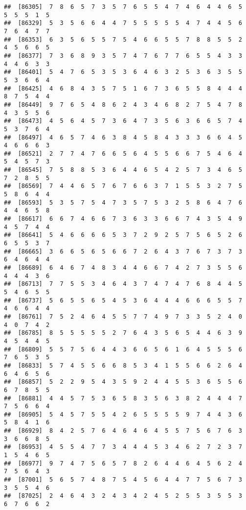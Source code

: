 \documentclass[
]{book}
\begin{document}
\begin{verbatim}
##  [86305]  7  8  6  5  7  3  5  7  6  5  5  4  7  4  6  4  4  6  5  5  5  5  1  5
##  [86329]  5  3  5  6  6  4  4  7  5  5  5  5  5  4  7  4  4  5  6  7  6  4  7  7
##  [86353]  6  3  5  6  5  5  7  5  4  6  6  5  5  7  8  8  5  5  2  4  5  6  6  5
##  [86377]  7  3  6  8  9  3  5  7  4  7  6  7  7  6  5  5  4  3  3  4  4  6  3  3
##  [86401]  5  4  7  6  5  3  5  3  6  4  6  3  2  5  3  6  3  5  5  5  3  6  6  4
##  [86425]  4  6  8  4  3  5  7  5  1  6  7  3  6  5  5  8  4  4  4  8  7  5  4  4
##  [86449]  9  7  6  5  4  8  6  2  4  3  4  6  8  2  7  5  4  7  8  4  3  5  5  6
##  [86473]  4  5  6  4  5  7  3  6  4  7  3  5  6  3  6  6  5  7  4  5  3  7  6  4
##  [86497]  4  6  5  7  4  6  3  8  4  5  8  4  3  3  3  6  6  4  5  4  6  6  6  3
##  [86521]  2  7  7  4  7  6  6  5  6  4  5  5  6  6  7  5  4  6  4  5  4  5  7  3
##  [86545]  7  5  8  8  5  3  6  4  4  6  5  4  2  5  7  3  4  6  5  7  2  8  5  5
##  [86569]  7  4  4  6  5  7  6  7  6  6  3  7  1  5  5  3  2  7  5  5  8  6  4  4
##  [86593]  5  3  5  7  5  4  7  3  5  7  5  3  2  5  8  6  4  7  6  4  4  6  5  8
##  [86617]  6  6  7  4  6  6  7  3  6  3  3  6  6  7  4  3  5  4  9  4  5  7  4  4
##  [86641]  5  4  6  6  6  6  5  3  7  2  9  2  5  7  5  6  5  2  6  6  5  5  3  7
##  [86665]  3  6  6  5  6  5  6  6  7  2  6  4  3  7  6  7  3  7  3  6  4  6  4  4
##  [86689]  6  4  6  7  4  8  3  4  4  6  6  7  4  2  7  3  5  5  6  4  4  4  3  6
##  [86713]  7  7  5  5  3  4  6  4  3  7  4  7  4  7  6  8  4  4  5  5  4  6  5  5
##  [86737]  5  6  5  5  6  5  4  5  3  6  4  4  4  6  6  6  5  5  7  4  6  6  4  4
##  [86761]  7  5  2  4  6  4  5  5  7  7  4  9  7  3  3  5  2  4  0  4  0  7  4  2
##  [86785]  8  5  5  5  5  5  2  7  6  4  3  5  6  5  4  4  6  3  9  4  5  4  4  5
##  [86809]  5  5  7  5  6  4  4  3  6  6  5  6  1  6  4  5  5  5  6  7  6  5  3  5
##  [86833]  5  7  4  5  5  6  6  8  5  3  4  1  5  5  6  6  2  6  4  6  4  6  5  6
##  [86857]  5  2  2  9  5  4  3  5  9  2  4  4  5  5  3  6  5  5  6  6  7  8  5  5
##  [86881]  4  4  5  7  5  3  6  5  8  3  5  6  3  8  2  4  4  4  7  7  5  6  6  4
##  [86905]  5  4  5  7  5  5  4  2  6  5  5  5  5  9  7  4  4  3  6  5  8  4  1  6
##  [86929]  8  4  2  5  7  6  4  6  4  6  4  5  5  7  5  6  7  6  3  3  6  6  8  5
##  [86953]  4  5  5  4  7  7  3  4  4  4  5  3  4  6  2  7  2  3  7  1  5  4  6  5
##  [86977]  9  7  4  7  5  6  5  7  8  2  6  4  4  6  4  5  6  2  4  7  5  6  4  3
##  [87001]  5  6  5  7  4  8  7  5  4  5  6  4  4  7  7  5  6  7  3  3  5  5  4  6
##  [87025]  2  4  6  4  3  2  4  3  4  2  4  5  2  5  5  3  5  5  3  6  7  6  6  2

\end{verbatim}
\end{document}
